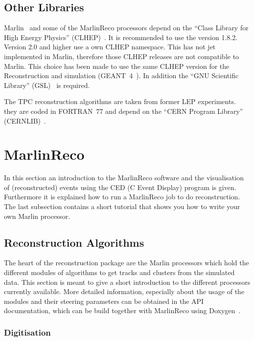 \subsection{Other Libraries}

Marlin~\cite{ref_marlin} and some of the MarlinReco processors depend on the
``Class Library for High Energy Physics'' (CLHEP)~\cite{ref_clhep}. 
It is recommended to use the version 1.8.2. Version 2.0 and higher use a 
own CLHEP namespace. This has not jet implemented in Marlin, therefore those
CLHEP releases are not compatible to Marlin. This choice has been 
made to use the same CLHEP version for the Reconstruction and simulation 
(GEANT~4~\cite{ref_geant4}). In addition the ``GNU Scientific Library'' 
(GSL)~\cite{ref_gsl} is required. 

The TPC reconstruction algorithms are taken from former LEP experiments.  
they are coded in FORTRAN~77 and depend on the ``CERN Program Library'' 
(CERNLIB)~\cite{ref_cernlib}. 

\section{MarlinReco}

In this section an introduction to the MarlinReco software and the
visualisation of (reconstructed) events using the 
CED (C Event Display) program is given. Furthermore it is explained how to 
run a MarlinReco job to do reconstruction. The last subsection 
contains a short tutorial that shows you how to write your own Marlin 
processor. 

\subsection{Reconstruction Algorithms}

The heart of the reconstruction package are the Marlin processors
which hold the different modules of algorithms to get tracks and 
clusters from the simulated data. This section is meant to give a short 
introduction to the different processors currently available. More detailed 
information, especially about the usage of the modules and their 
steering parameters can be obtained in the API documentation, which can be
build together with MarlinReco using Doxygen~\cite{ref_doxygen}. 

\subsubsection{Digitisation}

